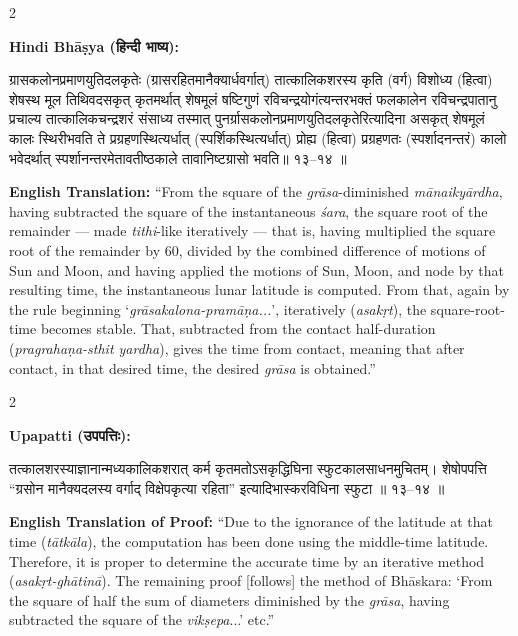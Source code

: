 \documentclass[11pt,a4paper]{article}
\newcommand{\dev}[1]{{\devanagarifont #1}}
\newenvironment{sanskritverse}{%
  \begin{center}\begin{minipage}{0.95\textwidth}
  \setlength{\leftskip}{1em}
  \setlength{\rightskip}{1em}
  \dev
}{\end{minipage}\end{center}}
\begin{document}
\begin{paracol}{2}

\noindent\textbf{Hindi Bhāṣya (\dev{हिन्दी भाष्य}):}
\begin{sanskritverse}
ग्रासकलोनप्रमाणयुतिदलकृतेः (ग्रासरहितमानैक्यार्धवर्गात्) तात्कालिकशरस्य कृति
(वर्ग) विशोध्य (हित्वा) शेषस्थ मूल तिथिवदसकृत् कृतमर्थात् शेषमूलं षष्टिगुणं
रविचन्द्रयोगंत्यन्तरभक्तं फलकालेन रविचन्द्रपातानु प्रचाल्य तात्कालिकचन्द्रशरं संसाध्य
तस्मात् पुनर्ग्रासकलोनप्रमाणयुतिदलकृतेरित्यादिना असकृत् शेषमूलं कालः स्थिरीभवति
ते प्रग्रहणस्थित्यर्धात् (स्पर्शिकस्थित्यर्धात्) प्रोह्य (हित्वा) प्रग्रहणतः (स्पर्शादनन्तरं)
कालो भवेदर्थात् स्पर्शानन्तरमेतावतीष्ठकाले तावानिष्टग्रासो भवति॥ १३--१४ ॥
\end{sanskritverse}

\switchcolumn

\textbf{English Translation:} ``From the square of the \textit{grāsa}-diminished \textit{mānaikyārdha}, having subtracted the square of the instantaneous \textit{śara}, the square root of the remainder --- made \textit{tithi}-like iteratively --- that is, having multiplied the square root of the remainder by 60, divided by the combined difference of motions of Sun and Moon, and having applied the motions of Sun, Moon, and node by that resulting time, the instantaneous lunar latitude is computed. From that, again by the rule beginning `\textit{grāsakalona-pramāṇa...}', iteratively (\textit{asakṛt}), the square-root-time becomes stable. That, subtracted from the contact half-duration (\textit{pragrahaṇa-sthit yardha}), gives the time from contact, meaning that after contact, in that desired time, the desired \textit{grāsa} is obtained.''

\end{paracol}

\vspace{0.5em}

\begin{paracol}{2}

\noindent\textbf{Upapatti (\dev{उपपत्तिः}):}
\begin{sanskritverse}
तत्कालशरस्याज्ञानान्मध्यकालिकशरात् कर्म कृतमतोऽसकृद्धिघिना स्फुटकालसाधनमुचितम्।
शेषोपपत्ति ``ग्रसोन मानैक्यदलस्य वर्गाद् विक्षेपकृत्या रहिता'' इत्यादिभास्करविधिना
स्फुटा ॥ १३--१४ ॥
\end{sanskritverse}

\switchcolumn

\textbf{English Translation of Proof:} ``Due to the ignorance of the latitude at that time (\textit{tātkāla}), the computation has been done using the middle-time latitude. Therefore, it is proper to determine the accurate time by an iterative method (\textit{asakṛt-ghātinā}). The remaining proof [follows] the method of Bhāskara: `From the square of half the sum of diameters diminished by the \textit{grāsa}, having subtracted the square of the \textit{vikṣepa}...' etc.''

\end{paracol}
\end{document}
